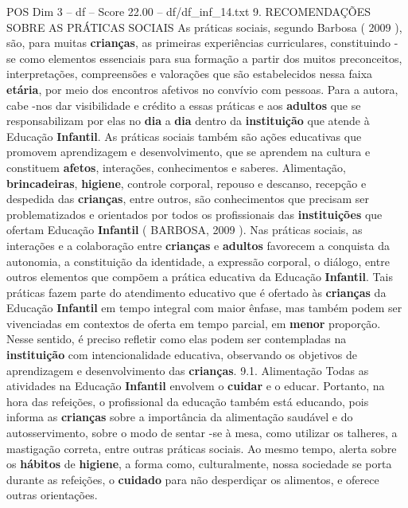 \begin{textsample}{POS Dim 3 – df – Score 22.00 – df/df\_inf\_14.txt}  \label{ex:f3_pos_122}
9.
RECOMENDAÇÕES SOBRE AS PRÁTICAS SOCIAIS As práticas sociais, segundo Barbosa ( 2009 ), são, para muitas \textbf{crianças}, as primeiras experiências curriculares, constituindo -se como elementos essenciais para sua formação a partir dos muitos preconceitos, interpretações, compreensões e valorações que são estabelecidos nessa faixa \textbf{etária}, por meio dos encontros afetivos no convívio com pessoas.
Para a autora, cabe -nos dar visibilidade e crédito a essas práticas e aos \textbf{adultos} que se responsabilizam por elas no \textbf{dia} a \textbf{dia} dentro da \textbf{instituição} que atende à Educação \textbf{Infantil}.
As práticas sociais também são ações educativas que promovem aprendizagem e desenvolvimento, que se aprendem na cultura e constituem \textbf{afetos}, interações, conhecimentos e saberes.
Alimentação, \textbf{brincadeiras}, \textbf{higiene}, controle corporal, repouso e descanso, recepção e despedida das \textbf{crianças}, entre outros, são conhecimentos que precisam ser problematizados e orientados por todos os profissionais das \textbf{instituições} que ofertam Educação \textbf{Infantil} ( BARBOSA, 2009 ).
Nas práticas sociais, as interações e a colaboração entre \textbf{crianças} e \textbf{adultos} favorecem a conquista da autonomia, a constituição da identidade, a expressão corporal, o diálogo, entre outros elementos que compõem a prática educativa da Educação \textbf{Infantil}.
Tais práticas fazem parte do atendimento educativo que é ofertado às \textbf{crianças} da Educação \textbf{Infantil} em tempo integral com maior ênfase, mas também podem ser vivenciadas em contextos de oferta em tempo parcial, em \textbf{menor} proporção.
Nesse sentido, é preciso refletir como elas podem ser contempladas na \textbf{instituição} com intencionalidade educativa, observando os objetivos de aprendizagem e desenvolvimento das \textbf{crianças}. 9.1.
Alimentação Todas as atividades na Educação \textbf{Infantil} envolvem o \textbf{cuidar} e o educar.
Portanto, na hora das refeições, o profissional da educação também está educando, pois informa as \textbf{crianças} sobre a importância da alimentação saudável e do autosservimento, sobre o modo de sentar -se à mesa, como utilizar os talheres, a mastigação correta, entre outras práticas sociais.
Ao mesmo tempo, alerta sobre os \textbf{hábitos} de \textbf{higiene}, a forma como, culturalmente, nossa sociedade se porta durante as refeições, o \textbf{cuidado} para não desperdiçar os alimentos, e oferece outras orientações.

\end{textsample}
